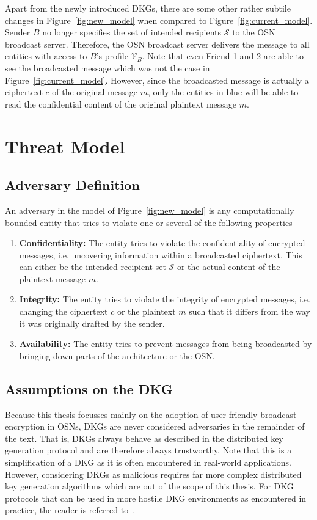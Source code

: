 Apart from the newly introduced DKGs, there are some other rather subtile changes in Figure~\ref{fig:new_model} when compared to Figure~\ref{fig:current_model}. Sender $B$ no longer specifies the set of intended recipients $\mathcal{S}$ to the OSN broadcast server. Therefore, the OSN broadcast server delivers the message to all entities with access to $B$'s profile $\mathcal{V}_B$. Note that even Friend 1 and 2 are able to see the broadcasted message which was not the case in Figure~\ref{fig:current_model}. However, since the broadcasted message is actually a ciphertext $c$ of the original message $m$, only the entities in blue will be able to read the confidential content of the original plaintext message $m$.

\section{Threat Model}

\subsection{Adversary Definition}
An adversary in the model of Figure~\ref{fig:new_model} is any computationally bounded entity that tries to violate one or several of the following properties
\begin{enumerate}
 \item \textbf{Confidentiality:} The entity tries to violate the confidentiality of encrypted messages, i.e. uncovering information within a broadcasted ciphertext. This can either be the intended recipient set $\mathcal{S}$ or the actual content of the plaintext message $m$.
 \item \textbf{Integrity:} The entity tries to violate the integrity of encrypted messages, i.e. changing the ciphertext $c$ or the plaintext $m$ such that it differs from the way it was originally drafted by the sender.
 \item \textbf{Availability:} The entity tries to prevent messages from being broadcasted by bringing down parts of the architecture or the OSN. 
\end{enumerate}

\subsection{Assumptions on the DKG}
Because this thesis focusses mainly on the adoption of user friendly broadcast encryption in OSNs, DKGs are never considered adversaries in the remainder of the text. That is, DKGs always behave as described in the distributed key generation protocol and are therefore always trustworthy. Note that this is a simplification of a DKG as it is often encountered in real-world applications. However, considering DKGs as malicious requires far more complex distributed key generation algorithms which are out of the scope of this thesis. For DKG protocols that can be used in more hostile DKG environments as encountered in practice, the reader is referred to~\cite{art:KateHG12}.

